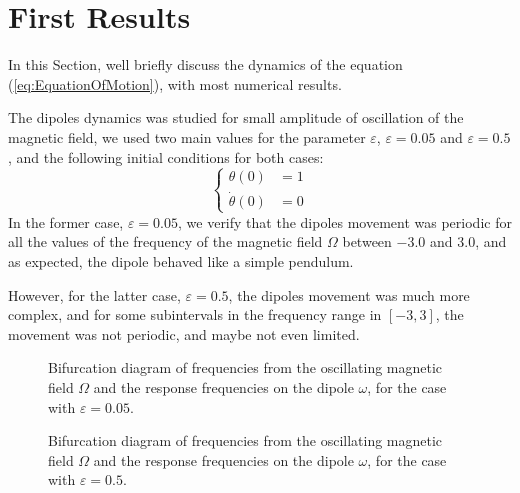 \section{First Results}

In this Section, we\textquotesingle ll briefly discuss the dynamics of the equation (\ref{eq:EquationOfMotion}), with most numerical results. 

The dipole\textquotesingle s dynamics was studied for small amplitude of oscillation of the magnetic field, we used two main values for the parameter $\varepsilon$, $\varepsilon = 0.05$ and $\varepsilon = 0.5$, and the following initial conditions for both cases:
\begin{equation}
    \begin{cases}
        \theta (0) &= 1\\        
        \dot{\theta}(0) &= 0
    \end{cases}
\end{equation} 
In the former case, $\varepsilon = 0.05$, we verify that the dipole\textquotesingle s movement was periodic for all the values of the frequency of the magnetic field $\Omega$ between $-3.0$ and $3.0$, and as expected, the dipole behaved like a simple pendulum. 

However, for the latter case, $\varepsilon = 0.5$, the dipole\textquotesingle s movement was much more complex, and for some subintervals in the frequency range in $[-3,3]$, the movement was not periodic, and maybe not even limited. 

\begin{figure}[h]
    \scalebox{0.7}{}
    \caption{Bifurcation diagram of frequencies from the oscillating magnetic field $\Omega$ and the response frequencies on the dipole $\omega$, for the case with $\varepsilon = 0.05$.}
    \label{fig:big005}
\end{figure}

\begin{figure}[h]
    \scalebox{0.7}{}
    \caption{Bifurcation diagram of frequencies from the oscillating magnetic field $\Omega$ and the response frequencies on the dipole $\omega$, for the case with $\varepsilon = 0.5$.}
    \label{fig:bif05}
\end{figure}
